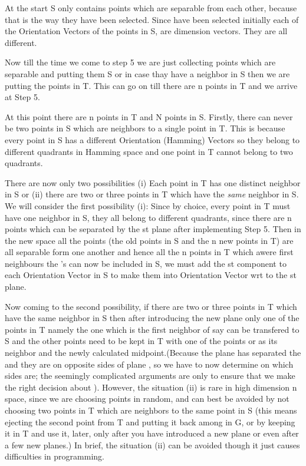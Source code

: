 \documentclass[english]{article}
\begin{document}
At the start S only contains points which are separable from each
other, because that is the way they have been selected. Since 
have been selected initially each of the Orientation Vectors of the
points in S, are  dimension vectors. They are all different.

Now till the time we come to step 5 we are just collecting points
which are separable and putting them S or in case thay have a neighbor
in S then we are putting the points in T. This can go on till there
are n points in T and we arrive at Step 5.

At this point there are n points in T and N points in S. Firstly,
there can never be two points in S which are neighbors to a single
point in T. This is because every point in S has a different Orientation
(Hamming) Vectors so they belong to different quadrants in Hamming
space and one point in T cannot belong to two quadrants.

There are now only two possibilities (i) Each point in T has one distinct
neighbor in S or (ii) there are two or three points in T which have
the \textit{same} neighbor in S. We will consider the first possibility
(i): Since by choice, every point in T must have one neighbor in S,
they all belong to different quadrants, since there are n points which
can be separated by the  st plane after implementing Step 5.
Then in the new  space all the points (the old points in S and
the n new points in T) are all separable form one another and hence
all the n points in T which awere first neighbours the 's
can now be included in S, we must add the  st component to each
Orientation Vector in S to make them into Orientation Vector wrt to
the  st plane.

Now coming to the second possibility, if there are two or three points
in T which have the same neighbor in S then after introducing the
new  plane only one of the points in T namely the one which
is the first neighbor of  say can be transfered to
S and the other points   need to be kept in T with
one of the points  or  as its neighbor and the newly
calculated midpoint.(Because the  plane has separated the and
 they are on opposite sides of plane , so we have to
now determine on which sides   are; the seemingly
complicated arguments are only to ensure that we make the right decision
about  ). However, the situation (ii) is rare in
high dimension n space, since we are choosing points in random, and
can best be avoided by not choosing two points in T which are neighbors
to the same point in S (this means ejecting the second point from
T and putting it back among  in G, or by keeping it in T and
use it, later, only after you have introduced a new plane or even
after a few new planes.) In brief, the situation (ii) can be avoided
though it just causes difficulties in programming.
\end{document}
